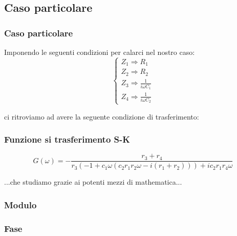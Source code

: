 
			\subsection{Caso particolare} %
			\label{sub:caso_particolare}
			
			\begin{frame}[c]\frametitle{Caso particolare}
			    
				Imponendo le seguenti condizioni per calarci nel nostro caso:
				\begin{equation}
				    \label{eq:Caso_particolare}
					\begin{cases}
					Z_1 \Longrightarrow R_1\\
					Z_2 \Longrightarrow R_2\\
					Z_3 \Longrightarrow \frac{1}{i \omega C_1}\\
					Z_4 \Longrightarrow \frac{1}{i \omega C_2}
					\end{cases}
				\end{equation}

				\pause

				ci ritroviamo ad avere la seguente condizione di trasferimento:

			\end{frame}

			\begin{frame}[c]\frametitle{Funzione si trasferimento S-K}

			\begin{equation}
			    \label{eq:s-k}
					G\left(\omega\right)= -\frac{r_3+r_4}{r_3 (-1+c_1 \omega  (c_2 r_1 r_2 \omega -i (r_1+r_2)))+i c_2 r_1 r_4 \omega }
			\end{equation}
			    \pause
			    \begin{center}
			    	...che studiamo grazie ai potenti mezzi di mathematica...
			    \end{center}
			\end{frame}

			\begin{frame}[c]\frametitle{Modulo}
				
					    
					
			\end{frame}

			\begin{frame}[c]\frametitle{Fase}

	 			
			
			\end{frame}



